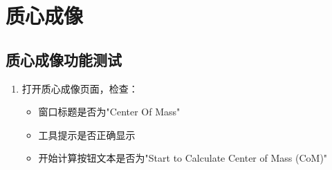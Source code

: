 \documentclass[a4paper,12pt]{report}	%
\begin{document}
\section{质心成像}

\subsection{质心成像功能测试}
\begin{enumerate}
    \item 打开质心成像页面，检查：
    \begin{itemize}
        \item 窗口标题是否为"Center Of Mass"
        \item 工具提示是否正确显示
        \item 开始计算按钮文本是否为"Start to Calculate Center of Mass (CoM)"
    \end{itemize}


\end{enumerate}
\end{document}
